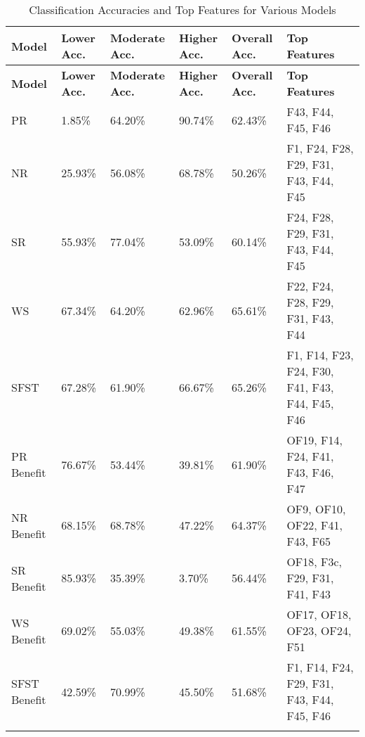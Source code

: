 \begin{longtable}{|p{2cm}|p{2cm}|p{2cm}|p{2cm}|p{2cm}|p{4cm}|}
\hline
\textbf{Model} & \textbf{Lower Acc.} & \textbf{Moderate Acc.} & \textbf{Higher Acc.} & \textbf{Overall Acc.} & \textbf{Top Features} \\ \hline
\endfirsthead
\hline
\textbf{Model} & \textbf{Lower Acc.} & \textbf{Moderate Acc.} & \textbf{Higher Acc.} & \textbf{Overall Acc.} & \textbf{Top Features} \\ \hline
\endhead


PR & 1.85\% & 64.20\% & 90.74\% & 62.43\% & F43, F44, F45, F46 \\ \hline
NR & 25.93\% & 56.08\% & 68.78\% & 50.26\% & F1, F24, F28, F29, F31, F43, F44, F45 \\ \hline
SR & 55.93\% & 77.04\% & 53.09\% & 60.14\% & F24, F28, F29, F31, F43, F44, F45 \\ \hline
WS & 67.34\% & 64.20\% & 62.96\% & 65.61\% & F22, F24, F28, F29, F31, F43, F44 \\ \hline
SFST & 67.28\% & 61.90\% & 66.67\% & 65.26\% & F1, F14, F23, F24, F30, F41, F43, F44, F45, F46 \\ \hline

PR Benefit & 76.67\% & 53.44\% & 39.81\% & 61.90\% & OF19, F14, F24, F41, F43, F46, F47 \\ \hline
NR Benefit & 68.15\% & 68.78\% & 47.22\% & 64.37\% & OF9, OF10, OF22, F41, F43, F65 \\ \hline
SR Benefit & 85.93\% & 35.39\% & 3.70\% & 56.44\% & OF18, F3c, F29, F31, F41, F43 \\ \hline
WS Benefit & 69.02\% & 55.03\% & 49.38\% & 61.55\% & OF17, OF18, OF23, OF24, F51 \\ \hline
SFST Benefit & 42.59\% & 70.99\% & 45.50\% & 51.68\% & F1, F14, F24, F29, F31, F43, F44, F45, F46 \\ \hline
\caption{Classification Accuracies and Top Features for Various Models}
\label{tab:grouping_1b}
\end{longtable}



